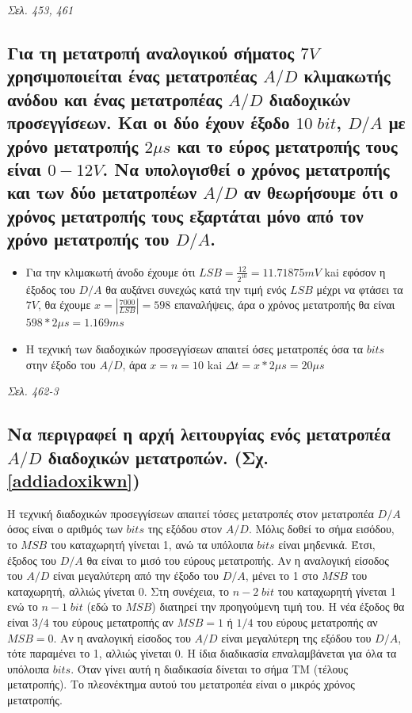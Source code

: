 \documentclass{article}
\begin{document}
\emph{Σελ. 453, 461}

\subsection{Για τη μετατροπή αναλογικού σήματος $7V$ χρησιμοποιείται ένας μετατροπέας $A/D$ κλιμακωτής ανόδου και ένας μετατροπέας $A/D$ διαδοχικών προσεγγίσεων. Και οι δύο έχουν έξοδο 
$10\; bit$, $D/A$ με χρόνο μετατροπής $2\mu s$ και το εύρος μετατροπής τους είναι $0-12V$. Να υπολογισθεί ο χρόνος μετατροπής και των δύο μετατροπέων $A/D$ αν θεωρήσουμε ότι ο χρόνος
μετατροπής τους εξαρτάται μόνο από τον χρόνο μετατροπής του $D/A$.}
    
\begin{itemize}
    \item Για την κλιμακωτή άνοδο έχουμε ότι $LSB = \frac{12}{2^{10}} = 11.71875mV$ kai εφόσον η έξοδος του $D/A$ θα αυξάνει συνεχώς κατά την τιμή ενός $LSB$ μέχρι να φτάσει τα $7V$, 
        θα έχουμε $x = |\frac{7000}{LSB}| = 598$ επαναλήψεις, άρα ο χρόνος μετατροπής θα είναι $598*2\mu s = 1.169ms$
    \item Η τεχνική των διαδοχικών προσεγγίσεων απαιτεί όσες μετατροπές όσα τα $bits$ στην έξοδο του $A/D$, άρα $x = n = 10$ kai $\Delta t = x * 2\mu s = 20\mu s$
\end{itemize}
\emph{Σελ. 462-3}

\subsection{Να περιγραφεί η αρχή λειτουργίας ενός μετατροπέα $A/D$ διαδοχικών μετατροπών. (Σχ. \ref{addiadoxikwn})}
Η τεχνική διαδοχικών προσεγγίσεων απαιτεί τόσες μετατροπές στον μετατροπέα $D/A$ όσος είναι ο αριθμός των $bits$ της εξόδου στον $A/D$. Μόλις δοθεί το σήμα εισόδου, το 
$MSB$ του καταχωρητή γίνεται 1, ανώ τα υπόλοιπα $bits$ είναι μηδενικά. Έτσι, έξοδος του $D/A$ θα είναι το μισό του εύρους μετατροπής. Αν η αναλογική είσοδος του $A/D$ 
είναι μεγαλύτερη από την έξοδο του $D/A$, μένει το 1 στο $MSB$ του καταχωρητή, αλλιώς γίνεται 0. Στη συνέχεια, το $n-2\;bit$ του καταχωρητή γίνεται 1 ενώ το $n-1\;bit$ (εδώ το $MSB$)
διατηρεί την προηγούμενη τιμή του. Η νέα έξοδος θα είναι $3/4$ του εύρους μετατροπής αν $MSB=1$ ή $1/4$ του εύρους μετατροπής αν $MSB=0$. Αν η αναλογική είσοδος του
$A/D$ είναι μεγαλύτερη της εξόδου του $D/A$, τότε παραμένει το 1, αλλιώς γίνεται 0. Η ίδια διαδικασία επναλαμβάνεται για όλα τα υπόλοιπα $bits$. Όταν γίνει αυτή η διαδικασία 
δίνεται το σήμα ΤΜ (τέλους μετατροπής). Το πλεονέκτημα αυτού του μετατροπέα είναι ο μικρός χρόνος μετατροπής.
\end{document}
